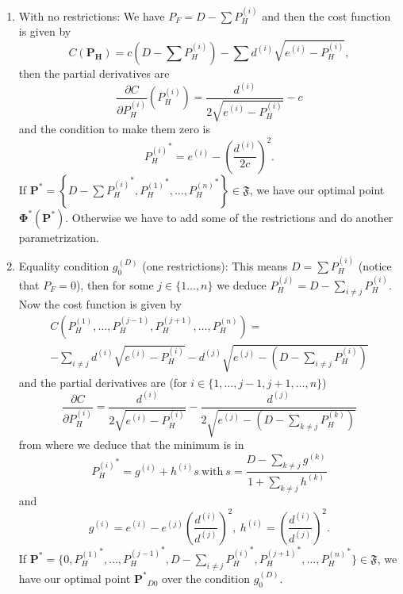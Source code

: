 \documentclass[12pt]{article}
\theoremstyle{definition}
\theoremstyle{remark}
\begin{document}
\begin{enumerate}

\item With no restrictions: We have $P_F=D-\sum P_H^{(i)}$ and then the cost function is given by
\begin{equation*}
C(\bm{P_H})=c\left(D-\sum P_H^{(i)}\right)-\sum d^{(i)}\sqrt{e^{(i)}-P_H^{(i)}},
\end{equation*}
then the partial derivatives are
\begin{equation}
\frac{\partial C}{\partial P_H^{(i)}}(P_H^{(i)})=\frac{d^{(i)}}{2\sqrt{e^{(i)}-P_H^{(i)}}}-c
\label{PD}
\end{equation}
and the condition to make them zero is
\begin{equation}
{P_H^{(i)}}^*=e^{(i)}-\left(\frac{d^{(i)}}{2c}\right)^2.
\label{Min}
\end{equation}
If $\bm{P^*}=\left\{D-\sum{P_H^{(i)}}^*,{P_H^{(1)}}^*,\dots,{P_H^{(n)}}^*\right\}\in\mathfrak{F}$, we have our optimal point $\bm{\Phi^*}(\bm{P^*})$. Otherwise we have to add some of the restrictions and do another parametrization.
\label{P1}

\item Equality condition $g^{(D)}_0$ (one restrictions): This means $D=\sum P_H^{(i)}$ (notice that $P_F=0$), then for some $j\in\{1\dots,n\}$ we deduce $P_H^{(j)}=D-\sum_{i\neq j}P_H^{(i)}$. Now the cost function is given by
\begin{multline*}
C(P_H^{(1)},\dots,P_H^{(j-1)},P_H^{(j+1)},\dots,P_H^{(n)})=\\
-\sum_{i\neq j}d^{(i)}\sqrt{e^{(i)}-P_H^{(i)}}-d^{(j)}\sqrt{e^{(j)}-\left(D-\sum_{i\neq j}P_H^{(i)}\right)}
\end{multline*}
and the partial derivatives are (for $i\in\{1,\dots,j-1,j+1,\dots,n\}$)
\begin{equation*}
\frac{\partial C}{\partial P_H^{(i)}}=\frac{d^{(i)}}{2\sqrt{e^{(i)}-P_H^{(i)}}}-\frac{d^{(j)}}{2\sqrt{e^{(j)}-\left(D-\sum_{k\neq j}P_H^{(k)}\right)}}
\end{equation*}
from where we deduce that the minimum is in
\begin{equation*}
{P_H^{(i)}}^*=g^{(i)}+h^{(i)}s\ \text{with}\ s=\frac{D-\sum_{k\neq j}g^{(k)}}{1+\sum_{k\neq j}h^{(k)}}
\end{equation*}
and
\begin{equation*}
g^{(i)}=e^{(i)}-e^{(j)}(\frac{d^{(i)}}{d^{(j)}})^2,\ h^{(i)}=(\frac{d^{(i)}}{d^{(j)}})^2.
\end{equation*}
If $\bm{P^*}=\{0,{P_H^{(1)}}^*,\dots,{P_H^{(j-1)}}^*,D-\sum_{i\neq j}{P_H^{(i)}}^*,{P_H^{(j+1)}}^*,\dots,{P_H^{(n)}}^*\}\in\mathfrak{F}$, we have our optimal point $\bm{P^*}_{D0}$ over the condition $g_0^{(D)}$.
\label{gD}


\end{enumerate}
\end{document}
